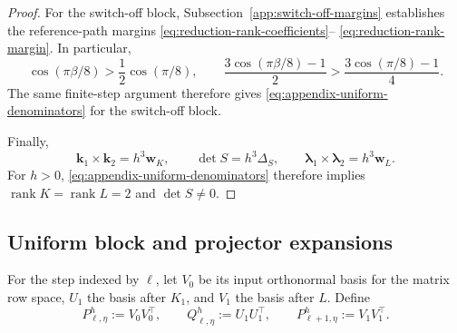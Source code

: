 \documentclass[]{article}
\numberwithin{equation}{section}
\theoremstyle{plain}
\theoremstyle{remark}
\begin{document}
\begin{proof}
For the switch-off block, Subsection~\ref{app:switch-off-margins}
establishes the reference-path margins
\eqref{eq:reduction-rank-coefficients}--
\eqref{eq:reduction-rank-margin}.  In particular,
\begin{equation}\label{eq:appendix-switch-off-margin-comparison}
 \cos(\pi\beta/8)>\frac12\cos(\pi/8),\qquad
 \frac{3\cos(\pi\beta/8)-1}{2}
 >\frac{3\cos(\pi/8)-1}{4}.
\end{equation}
The same finite-step argument therefore gives
\eqref{eq:appendix-uniform-denominators} for the switch-off block.

Finally,
\begin{equation}\label{eq:appendix-rank-conclusion}
 \boldsymbol k_1\times\boldsymbol k_2=h^3\boldsymbol w_K,
 \qquad \det S=h^3\Delta_S,
 \qquad \boldsymbol\lambda_1\times\boldsymbol\lambda_2=h^3\boldsymbol w_L.
\end{equation}
For \(h>0\), \eqref{eq:appendix-uniform-denominators} therefore implies
\(\operatorname{rank}K=\operatorname{rank}L=2\) and \(\det S\ne0\).
\end{proof}

\subsection{Uniform block and projector expansions}
\label{app:uniform-block-expansions}

For the step indexed by \(\ell\), let \(V_0\) be its input orthonormal
basis for the matrix row space,
\(U_1\) the basis after \(K_1\), and \(V_1\) the basis after \(L\).
Define
\begin{equation}\label{eq:appendix-projector-definitions}
 P^h_{\ell,\eta}:=V_0V_0^\top,
 \qquad
 Q^h_{\ell,\eta}:=U_1U_1^\top,
 \qquad
 P^h_{\ell+1,\eta}:=V_1V_1^\top.
\end{equation}
\end{document}
